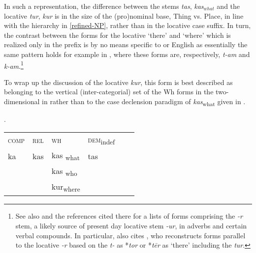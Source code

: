 \noindent 
In such a representation, the difference between the stems \textit{tas}, \textit{kas}$_{what}$ and the locative \textit{tur}, \textit{kur} is in the size of the (pro)nominal base, Thing vs. Place, in line with the  hierarchy in \ref{refined-NP}, rather than in the locative case suffix.   In turn, the contrast between the forms for the locative `there' and `where' which is realized only in the prefix is by no means specific to  or English as essentially the same pattern holds for example in , where these forms are, respectively, \textit{t-am} and \textit{k-am}.\footnote{See also \cite{Greenberg2000} and the references cited there for a lists of  forms comprising the \textit{-r} stem, a likely source of present day  locative stem \textit{-ur}, in adverbs and certain verbal compounds. In particular, \citet[147]{Greenberg2000} also cites \citet[1087]{Pokorny1959}, who reconstructs forms parallel to the  locative \textit{-r} based on the  \textit{t-} as *\textit{tor} or *\textit{t\={e}r} as `there' including the  \textit{tur}. 
} %
\par
To wrap up the discussion of the locative \textit{kur}, this form is best described as belonging to the vertical (inter-categorial) set of the Wh forms in the two-dimensional  in \Next rather than to the case declension paradigm of \textit{kas}\textsubscript{what} given in .

\ex.
\begin{tabular}[t]{ l l l l l l }
\textsc{comp} & \textsc{rel} 	& \textsc{wh}  	& \textsc{dem}\textsubscript{indef}\\	
 ka		 & kas\cellcolor[gray]{0.9}			& kas	\textsubscript{what}\cellcolor[gray]{0.9} 	& tas\\
		 & 							& kas	\textsubscript{who}\cellcolor[gray]{0.9}	& 	\\
		 &							& kur\textsubscript{where}				&	\\
\end{tabular}

